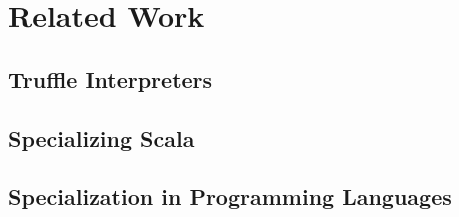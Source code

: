 
\chapter{Related Work}

\section{Truffle Interpreters}

\section{Specializing Scala}

\section{Specialization in Programming Languages}